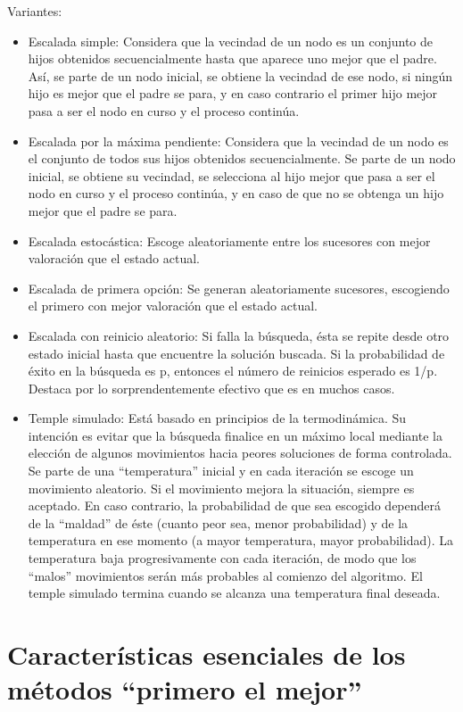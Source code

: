 \documentclass[12pt]{article}
\begin{document}
Variantes:
\begin{itemize}
\item Escalada simple: Considera que la vecindad de un nodo es un conjunto de 
  hijos obtenidos secuencialmente hasta que aparece uno mejor que el padre. Así, 
  se parte de un nodo inicial, se obtiene la vecindad de ese nodo, si ningún hijo 
  es mejor que el padre se para, y en caso contrario el primer hijo mejor pasa a 
  ser el nodo en curso y el proceso continúa.
\item Escalada por la máxima pendiente: Considera que la vecindad de un nodo es 
  el conjunto de todos sus hijos obtenidos secuencialmente. Se parte de un nodo 
  inicial, se obtiene su vecindad, se selecciona al hijo mejor que pasa a ser el 
  nodo en curso y el proceso continúa, y en caso de que no se obtenga un hijo 
  mejor que el padre se para.
\item Escalada estocástica: Escoge aleatoriamente entre los sucesores con 
  mejor valoración que el estado actual.
\item Escalada de primera opción: Se generan aleatoriamente sucesores, 
  escogiendo el primero con mejor valoración que el estado actual.
\item Escalada con reinicio aleatorio: Si falla la búsqueda, ésta se repite 
  desde otro estado inicial hasta que encuentre la solución buscada. Si la 
  probabilidad de éxito en la búsqueda es p, entonces el número de reinicios 
  esperado es 1/p. Destaca por lo sorprendentemente efectivo que es en muchos casos.
\item Temple simulado: 
  Está basado en principios de la termodinámica. Su intención es evitar 
  que la búsqueda finalice en un máximo local mediante la elección de algunos 
  movimientos hacia peores soluciones de forma controlada. Se parte de una 
  “temperatura” inicial y en cada iteración se escoge un 
  movimiento aleatorio. Si el movimiento mejora la situación, siempre es 
  aceptado. En caso contrario, la probabilidad de que sea escogido dependerá 
  de la “maldad” de éste (cuanto peor sea, menor probabilidad) y de la 
  temperatura en ese momento (a mayor temperatura, mayor probabilidad). La 
  temperatura baja progresivamente con cada iteración, de modo que los “malos” 
  movimientos serán más probables al comienzo del algoritmo. El temple simulado 
  termina cuando se alcanza una temperatura final deseada.
\end{itemize}


\section{Características esenciales de los métodos “primero el mejor”}
\end{document}
